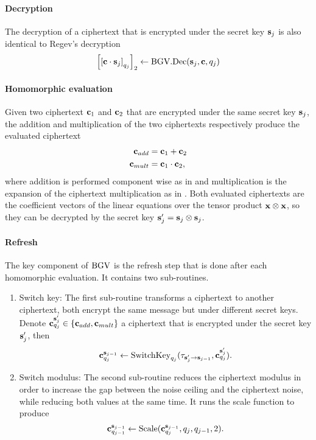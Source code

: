 \documentclass[../main.tex]{subfiles}
\begin{document}
\paragraph{Decryption} The decryption of a ciphertext that is encrypted under the secret key $\mathbf{s}_j$ is also identical to Regev's decryption 
\begin{align*}
    \sqbracket{\sqbracket{\vc{c} \cdot \vc{s}_j}_{q_j}}_2 \leftarrow \bgv.\dec(\vc{s}_j, \vc{c}, q_j) %
\end{align*}

\paragraph{Homomorphic evaluation} Given two ciphertext $\mathbf{c}_1$ and $\mathbf{c}_2$ that are encrypted under the same secret key $\mathbf{s}_j$, the addition and multiplication of the two ciphertexts respectively produce the evaluated ciphertext 
\begin{align*}
    \vc{c}_{add} &= \vc{c}_1 + \vc{c}_2 \\ %
    \vc{c}_{mult} &=\vc{c}_1 \cdot \vc{c}_2,
\end{align*}
where addition is performed component wise as in  and multiplication is the expansion of the ciphertext multiplication as in . Both evaluated ciphertexts are the coefficient vectors of the linear equations over the tensor product $\mathbf{x} \otimes \mathbf{x}$, so they can be decrypted by the secret key $\mathbf{s}_j' = \mathbf{s}_j \otimes \mathbf{s}_j$.

\paragraph{Refresh} The key component of $\text{BGV}$ is the refresh step that is done after each homomorphic evaluation. It contains two sub-routines. 
\begin{enumerate}
    \item Switch key: The first sub-routine transforms a ciphertext to another ciphertext, both encrypt the same message but under different secret keys. Denote $\mathbf{c}_{q_j}^{\mathbf{s}_{j}'} \in \{\mathbf{c}_{add}, \mathbf{c}_{mult}\}$ a ciphertext that is encrypted under the secret key $\mathbf{s}'_j$, then    
    \begin{align*}
        \mathbf{c}_{q_j}^{\mathbf{s}_{j-1}} \leftarrow \text{SwitchKey}_{q_j}(\tau_{\mathbf{s}'_j \rightarrow \mathbf{s}_{j-1}}, \mathbf{c}_{q_j}^{\mathbf{s}_{j}'}).
    \end{align*}
    
    \item Switch modulus: The second sub-routine reduces the ciphertext modulus in order to increase the gap between the noise ceiling and the ciphertext noise, while reducing both values at the same time. It runs the scale function to produce 
    \begin{align*}
        \mathbf{c}_{q_{j-1}}^{\mathbf{s}_{j-1}} \leftarrow \text{Scale}(\mathbf{c}_{q_j}^{\mathbf{s}_{j-1}}, q_j, q_{j-1}, 2).
    \end{align*}
\end{enumerate}
\end{document}
